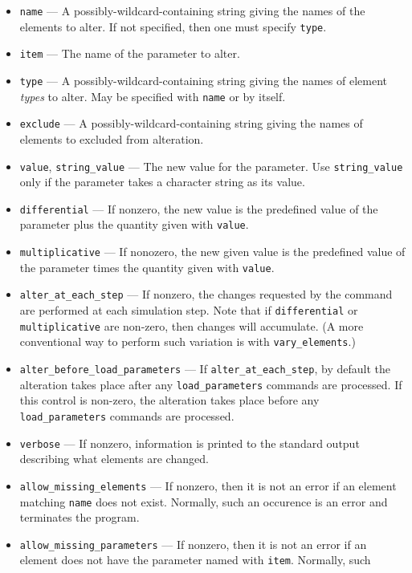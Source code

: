 \documentclass[11pt]{article}
\begin{document}
\begin{itemize}
\item \verb|name| --- A possibly-wildcard-containing string giving the names of the
        elements to alter.  If not specified, then one must specify \verb|type|.
\item \verb|item| --- The name of the parameter to alter.
\item \verb|type| --- A possibly-wildcard-containing string giving the names of element
        {\em types} to alter.  May be specified with \verb|name| or by itself.
\item \verb|exclude| --- A possibly-wildcard-containing string giving the names of elements
        to excluded from alteration.
\item \verb|value|, \verb|string_value| --- The new value for the parameter.  Use
      \verb|string_value| only if the parameter takes a character string as its value.
\item \verb|differential| --- If nonzero, the new value is 
        the predefined value of the parameter plus the quantity given with \verb|value|.
\item \verb|multiplicative| --- If nonozero, the new given value is the predefined
        value of the parameter times the quantity given with \verb|value|.
\item \verb|alter_at_each_step| --- If nonzero, the changes requested by the command are
  performed at each simulation step. Note that if \verb|differential| or \verb|multiplicative|
  are non-zero, then changes will accumulate. (A more conventional way to perform such variation
  is with \verb|vary_elements|.)
\item \verb|alter_before_load_parameters| --- If \verb|alter_at_each_step|, by default the
  alteration takes place after any \verb|load_parameters| commands are processed. If this control is
  non-zero, the alteration takes place before any \verb|load_parameters| commands are processed.
\item \verb|verbose| --- If nonzero, information is printed to the standard output describing
        what elements are changed.
\item \verb|allow_missing_elements| --- If nonzero, then it is not an error if an
        element matching \verb|name| does not exist.   Normally, such
        an occurence is an error and terminates the program.
\item \verb|allow_missing_parameters| --- If nonzero, then it is not an error if an
        element does not have the parameter named with \verb|item|.  Normally, such

\end{itemize}
\end{document}
